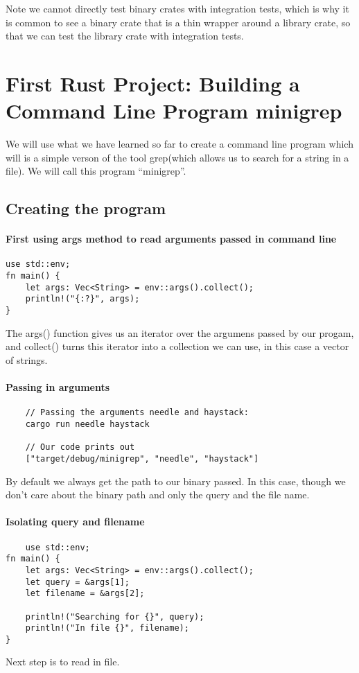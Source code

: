 Note we cannot directly test binary crates with integration tests, which is why it is common to see a binary crate that is a thin wrapper around a library crate, so that we can test the library crate with integration tests.

\section{First Rust Project: Building a Command Line Program minigrep}
We will use what we have learned so far to create a command line program which will is a simple verson of the tool grep(which allows us to search for a string in a file). We will call this program ``minigrep''. 


\subsection{Creating the program}

\paragraph*{First using args method to read arguments passed in command line}\begin{lstlisting}
use std::env;
fn main() {
    let args: Vec<String> = env::args().collect(); 
    println!("{:?}", args);
}
\end{lstlisting}
The {args}() function gives us an iterator over the argumens passed by our progam, and {collect}() turns this iterator into a collection we can use, in this case a vector of strings.

\paragraph*{Passing in arguments}\begin{lstlisting}
    // Passing the arguments needle and haystack:
    cargo run needle haystack

    // Our code prints out 
    ["target/debug/minigrep", "needle", "haystack"]
\end{lstlisting}
By default we always get the path to our binary passed. In this case, though we don't care about the binary path and only the query and the file name.
\paragraph*{Isolating query and filename}\begin{lstlisting}
    use std::env;
fn main() {
    let args: Vec<String> = env::args().collect(); 
    let query = &args[1];
    let filename = &args[2];
    
    println!("Searching for {}", query);
    println!("In file {}", filename);
}
\end{lstlisting}
Next step is to read in file.

